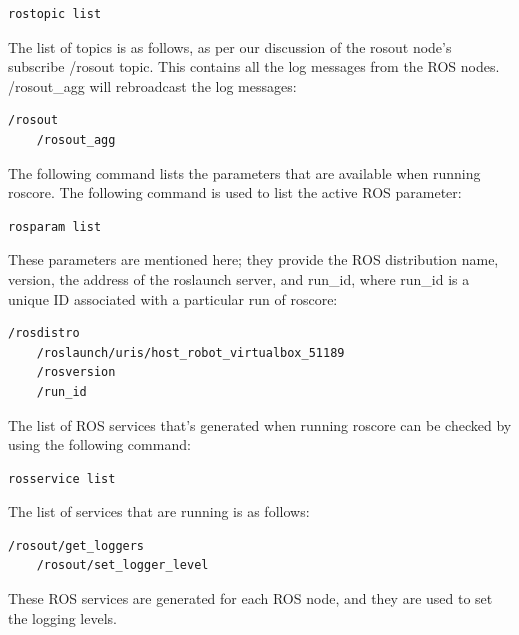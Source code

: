 \documentclass[../../main]{subfiles}
\begin{document}
\begin{lstlisting}[language=bash, frame=shadowbox]
    rostopic list
\end{lstlisting}

The list of topics is as follows, as per our discussion of the rosout node's subscribe /rosout topic. This contains all the log messages from the ROS nodes. /rosout\_agg will rebroadcast the log messages:

\begin{lstlisting}[language=bash, frame=shadowbox]
    /rosout
    /rosout_agg
\end{lstlisting}

The following command lists the parameters that are available when running roscore. The following command is used to list the active ROS parameter:

\begin{lstlisting}[language=bash, frame=shadowbox,basicstyle=\bfseries ]
    rosparam list
\end{lstlisting}

These parameters are mentioned here; they provide the ROS distribution name, version, the address of the roslaunch server, and run\_id, where run\_id is a unique ID associated with a particular run of roscore:

\begin{lstlisting}[language=bash, frame=shadowbox]
    /rosdistro
    /roslaunch/uris/host_robot_virtualbox_51189
    /rosversion
    /run_id
\end{lstlisting}

The list of ROS services that's generated when running roscore can be checked by using the following command:

\begin{lstlisting}[language=bash, frame=shadowbox]
    rosservice list
\end{lstlisting}
The list of services that are running is as follows:
\begin{lstlisting}[language=bash, frame=shadowbox]
    /rosout/get_loggers
    /rosout/set_logger_level
\end{lstlisting}
These ROS services are generated for each ROS node, and they are used to set the logging
levels.
\end{document}

